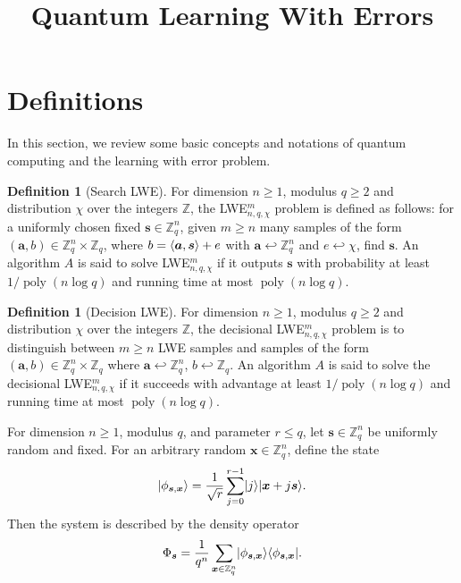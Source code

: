 \documentclass[11pt]{article}
\title{Quantum Learning With Errors}
\author{
}
\date{}
\theoremstyle{plain}
\theoremstyle{definition}
\newtheorem{definition}[theorem]{Definition}
\DeclareMathOperator{\poly}{poly}
\DeclarePairedDelimiter{\ldbrac}{\lvert}{\rangle}
\DeclarePairedDelimiter{\rdbrac}{\langle}{\rvert}
\DeclarePairedDelimiter{\lrang}{\langle}{\rangle}
\def\Z{\ensuremath{\mathbb{Z}}}
\begin{document}
\maketitle








\section{Definitions}


In this section, we review some basic concepts and notations of quantum computing and the learning with error problem. 

\begin{definition}[Search LWE]
    For dimension $n \ge 1$, modulus $q \ge 2$ and distribution $\chi$ over the integers $\Z$, the LWE$_{n, q, \chi}^m$ problem is defined as follows: for a uniformly chosen fixed $\bm{s} \in \Z_q^n$, given $m \ge n$ many samples of the form $(\bm{a}, b) \in \Z_q^n \times \Z_q$, where $b = \lrang{\bm{a}, \bm{s}} + e$ with $\bm{a} \hookleftarrow \Z_q^n$ and $e \hookleftarrow \chi$, find $\bm{s}$. An algorithm $A$ is said to solve LWE$_{n, q, \chi}^m$ if it outputs $\bm{s}$ with probability at least $1 / \poly(n\log q)$ and running time at most $\poly(n\log q)$.
\end{definition}
\begin{definition}[Decision LWE]
    For dimension $n \ge 1$, modulus $q \ge 2$ and distribution $\chi$ over the integers $\Z$, the decisional LWE$_{n, q, \chi}^m$ problem is to distinguish between $m \ge n$ LWE samples and samples of the form $(\bm{a}, b) \in \Z_q^n \times \Z_q$ where $\bm{a} \hookleftarrow \Z_q^n$, $b \hookleftarrow \Z_q$. An algorithm $A$ is said to solve the decisional LWE$_{n, q, \chi}^m$ if it succeeds with advantage at least $1 / \poly(n\log q)$ and running time at most $\poly(n\log q)$. 
\end{definition}
For dimension $n \ge 1$, modulus $q$, and parameter $r \le q$, let $\bm{s} \in \Z_q^n$ be uniformly random and fixed. For an arbitrary random $\bm{x} \in \Z_q^n$, define the state
\[ \ldbrac{\phi_{\bm{s}, \bm{x}}} = \frac{1}{\sqrt{r}} \sum_{j = 0}^{r - 1}\ldbrac{j}\ldbrac{\bm{x} + j\bm{s}}. \]
Then the  system is described by the density operator  
\[ \Phi_{\bm{s}} = \frac{1}{q^n} \sum_{\bm{x} \in \Z_q^n} \ldbrac{\phi_{\bm{s}, \bm{x}}} \rdbrac{\phi_{\bm{s}, \bm{x}}}. \]
\end{document}
